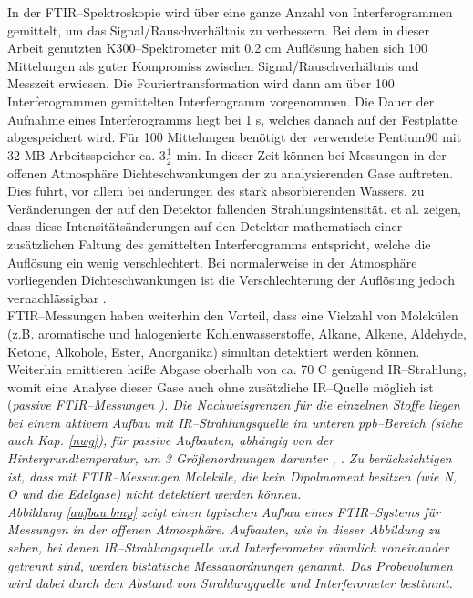 In der FTIR--Spektroskopie wird über eine ganze Anzahl von
Interferogrammen gemittelt, um das Signal/Rauschverhältnis zu
verbessern. Bei dem in dieser Arbeit genutzten K300--Spektrometer
mit 0.2 cm Auflösung haben sich 100 Mittelungen als guter
Kompromiss zwischen Signal/Rauschverhältnis und Messzeit erwiesen.
Die Fouriertransformation wird dann am über 100 Interferogrammen
gemittelten Interferogramm vorgenommen. Die Dauer der Aufnahme
eines Interferogramms liegt bei 1 s, welches danach auf der
Festplatte abgespeichert wird. Für 100 Mittelungen benötigt der
verwendete Pentium90 mit 32 MB Arbeitsspeicher ca. 3$\frac{1}{2}$
min. In dieser Zeit können bei Messungen in der offenen Atmosphäre
Dichteschwankungen der zu analysierenden Gase auftreten. Dies
führt, vor allem bei änderungen des stark absorbierenden Wassers,
zu Veränderungen der auf den Detektor fallenden
Strahlungsintensität. \cite{kyle84} et al. zeigen, dass diese
Intensitätsänderungen auf den Detektor mathematisch einer
zusätzlichen Faltung des gemittelten Interferogramms entspricht,
welche die Auflösung ein wenig verschlechtert. Bei normalerweise
in der Atmosphäre vorliegenden Dichteschwankungen ist die
Verschlechterung der Auflösung jedoch vernachlässigbar
\cite{kyle84}.\\

FTIR--Messungen haben weiterhin den Vorteil, dass eine Vielzahl
von Molekülen (z.B. aromatische und halogenierte
Kohlenwasserstoffe, Alkane, Alkene, Aldehyde, Ketone, Alkohole,
Ester, Anorganika) simultan detektiert werden können. Weiterhin
emittieren heiße Abgase oberhalb von ca. 70 C genügend
IR--Strahlung, womit eine Analyse dieser Gase auch ohne
zusätzliche IR--Quelle möglich ist (\it passive FTIR--Messungen\rm
). Die Nachweisgrenzen für die einzelnen Stoffe liegen bei einem
aktivem Aufbau mit IR--Strahlungsquelle im unteren ppb--Bereich
(siehe auch Kap. \ref{nwg}), für passive Aufbauten, abhängig von
der Hintergrundtemperatur, um 3 Grö{\ss}enordnungen darunter
\cite{chaffin99}, \cite{mattuip}. Zu berücksichtigen ist, dass mit
FTIR--Messungen Moleküle, die kein Dipolmoment besitzen (wie
N, O und die Edelgase) nicht detektiert werden
können.\\


Abbildung \ref{aufbau.bmp} zeigt einen typischen Aufbau eines
FTIR--Systems für Messungen in der offenen Atmosphäre. Aufbauten,
wie in dieser Abbildung zu sehen, bei denen IR--Strahlungsquelle
und Interferometer räumlich voneinander getrennt sind, werden \it
bistatische \rm Messanordnungen genannt. Das Probevolumen wird
dabei durch den Abstand von Strahlungquelle und Interferometer
bestimmt.\\

